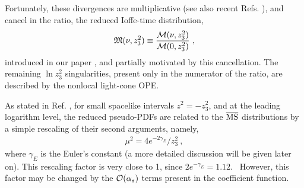 Fortunately, these divergences are multiplicative \mbox{\cite{Polyakov:1980ca,Dotsenko:1979wb,Brandt:1981kf,Aoyama:1981ev,Craigie:1980qs}}  (see also
 recent Refs.
 \cite{Ishikawa:2017faj,Ji:2017oey,Green:2017xeu}), and cancel in the ratio,
 the  reduced Ioffe-time distribution,
 \begin{align}
{\mathfrak M} (\nu, z_3^2) \equiv \frac{ {\cal M} (\nu, z_3^2)}{{\cal M} (0, z_3^2)} \   ,
 \label{redm}
\end{align}
 introduced in our paper \cite{Radyushkin:2017cyf}, and partially motivated
 by this cancellation.
 The remaining $\ln z_3^2$ singularities, present only in the numerator of the ratio,
  are   described by the nonlocal light-cone OPE.


As stated in Ref.  \cite{Orginos:2017kos}, for
 small spacelike intervals $z^2=-z_3^2$,  and at the leading logarithm level, the reduced pseudo-PDFs are
related to the $\overline{\rm MS}$ distributions by a simple rescaling of their second arguments,
namely,
\begin{align}
\mu^2  =4e^{-2\gamma_E}/ z_3^2
  \  ,
\label{Ptof}
\end{align}
where $\gamma_E$  is the Euler's constant (a more detailed discussion  will be given later on).
This  rescaling  factor  is very close to 1, since \mbox{$2e^{-\gamma_E}=1.12$. }
However, this factor may be changed by the $ {\cal O} (\alpha_s) $  terms present in the coefficient function.
